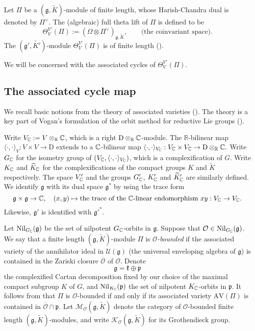 \documentclass[lang = american]{ems-icm} %
\newcommand{\R}{\mathbb R}
\newcommand{\AV}{\mathrm{AV}}
\newcommand{\g}{\mathfrak g}
\newcommand{\p}{\mathfrak p}
\newcommand{\rD}{\mathrm D}
\newcommand{\CK}{{\mathcal {K}}}
\newcommand{\CM}{{\mathcal {M}}}
\newcommand{\CO}{{\mathcal {O}}}
\newcommand{\CU}{{\mathcal {U}}}
\numberwithin{equation}{section}
\theoremstyle{remark}
\begin{document}
Let $\Pi$ be a $(\g,\widetilde{K})$-module of finite length, whose Harish-Chandra dual is denoted by $\Pi^{\vee}$. The (algebraic) full theta lift of $\Pi$ is defined to be
\[
  \Theta_{V}^{V'}(\Pi ):= \left(\Omega \otimes \Pi^{\vee} \right)_{\g, \widetilde{K}},\qquad
  \text{(the coinvariant space).}
\]
The $(\g',\widetilde{K'})$-module $\Theta_{V}^{V'}(\Pi)$ is of finite length (\cite{Ho3}).

We will be concerned with the associated cycles of $\Theta_{V}^{V'}(\Pi)$.

\subsection{The associated cycle map}

We recall basic notions from the theory of associated varieties (\cite{VoAss}). The theory is a key part of Vogan's formulation of the orbit method for reductive Lie groups (\cites{VoUni,VoPar}).

Write $V_\C:=V\otimes_\R \C$, which is a right $\rD\otimes_\R \C$-module. The $\R$-bilinear map $
\langle\cdot , \cdot  \rangle_{V}: V\times V\rightarrow \rD
$ extends to a $\mathbb{C}$-bilinear map
$
\langle\cdot , \cdot  \rangle_{V_\C}: V_\C\times V_\C\rightarrow \rD\otimes_\R \C.
$
Write $G_{\mathbb{C}}$ for the isometry group of $(V_{\mathbb{C}}, \langle\cdot , \cdot  \rangle_{V_{\mathbb{C}}})$, which is a complexification of $G$. Write $K_{\mathbb{C}}$ and $\widetilde K_{\mathbb{C}}$ for the complexifications of the compact groups $K$ and $\widetilde K$ respectively.
The space $V'_{\mathbb{C}}$ and the groups $G'_{\mathbb{C}}$, $K'_{\mathbb{C}}$ and $\widetilde K'_{\mathbb{C}}$ are similarly defined.
We identify $\g$ with its dual space $\g^*$ by using the trace form
\[
  \g\times \g\rightarrow \C, \quad (x,y)\mapsto \textrm{the trace of the $\C$-linear endomorphism $xy: V_\C\rightarrow V_\C$}.
\]
Likewise, $\g'$ is identified with ${\g'}^*$.

Let $\mathrm{Nil}_{G_{\C}}(\g)$ be the set of nilpotent $G_{\mathbb{C}}$-orbits in $\g$. Suppose that $\CO \in \mathrm{Nil}_{G_{\C}}(\g)$.
We say that a finite length $(\g,\widetilde{K})$-module $\Pi$ is \emph{$\CO$-bounded} if the associated variety of the annihilator ideal in $\CU(\g)$ (the universal enveloping algebra of $\g$) is contained in the Zariski closure $\overline \CO$ of $\CO$. Denote
\[
  \g=\mathfrak{k}\oplus \p
\]
the complexified Cartan decomposition fixed by our choice of the maximal compact subgroup $K$ of $G$, and $\mathrm{Nil}_{K_{\C}}(\p)$ the set of nilpotent $K_{\mathbb{C}}$-orbits in $\p$.
It follows from \cite[Theorem 8.4]{VoUni}
that $\Pi$ is $\CO$-bounded if and only if its associated variety $\AV(\Pi)$ is contained in
$\overline \CO \cap \p$.
Let
$\CM_{\CO}(\g,\widetilde{K})$ denote the category of $\CO$-bounded finite length $(\g,\widetilde{K})$-modules, and write
$\CK_{\CO}(\g,\widetilde{K})$ for its Grothendieck group.
\end{document}
